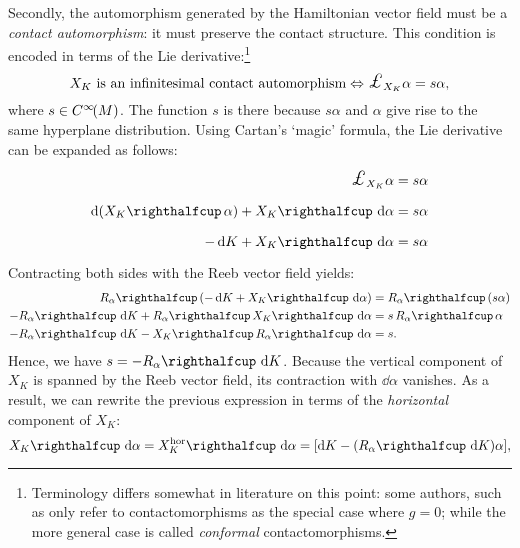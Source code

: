 Secondly, the automorphism generated by the Hamiltonian vector field must be a \emph{contact automorphism}: it must preserve the contact structure. This condition is encoded in terms of the Lie derivative:\footnote
{Terminology differs somewhat in literature on this point: some authors, such as \citet{DeLeon2020} only refer to contactomorphisms as the special case where \(g = 0\); while the more general case is called \emph{conformal} contactomorphisms.}
\begin{equation}
     X_K \text{ is an infinitesimal contact automorphism} \Leftrightarrow \lied{X_K}{\alpha} = s\alpha,
\end{equation}
where \(s \in C^\infty\!\qty(M)\). The function \(s\) is there because \(s \alpha \) and \(\alpha\) give rise to the same hyperplane distribution. 
Using Cartan's `magic' formula, the Lie derivative can be expanded as follows:
\begin{equation*}
    \begin{split}
        \lied{X_K}{\alpha} &= s \alpha\\
        \dd{\qty(\intpr{X_K}{\alpha})} + \intpr{X_K}{\dd{\alpha}} &= s\alpha \\
        -\dd{K} + \intpr{X_K}{\dd{\alpha}} &= s\alpha \\
    \end{split}
\end{equation*}
Contracting both sides with the Reeb vector field yields:
\begin{equation*}
    \begin{split}
        \intpr{R_\alpha}{\qty(-\dd{K} + \intpr{X_K}{\dd{\alpha}})} &= \intpr{R_\alpha}{\qty(s\alpha)} \\
        -\intpr{R_\alpha}{\dd{K}} + \intpr{R_\alpha}{\intpr{X_K}{\dd{\alpha}}} &= s\,\intpr{R_\alpha}{\alpha} \\
        -\intpr{R_\alpha}{\dd{K}} - \intpr{X_K}{\intpr{R_\alpha}{\dd{\alpha}}} &= s.
    \end{split}
\end{equation*}
Hence, we have \(s = -\intpr{R_\alpha}{\dd{K}}\). Because the vertical component of \(X_K\) is spanned by the Reeb vector field, its contraction with \(\dd{\alpha}\) vanishes. As a result, we can rewrite the previous expression in terms of the \emph{horizontal} component of \(X_K\):
\begin{equation}
    \intpr{X_K}{\dd{\alpha}} = \intpr{X_K^\text{hor}}{\dd{\alpha}}=  \qty[\dd{K} - \qty(\intpr{R_\alpha}{\dd{K}})\alpha], 
    \label{eq:basic_form}
\end{equation}
